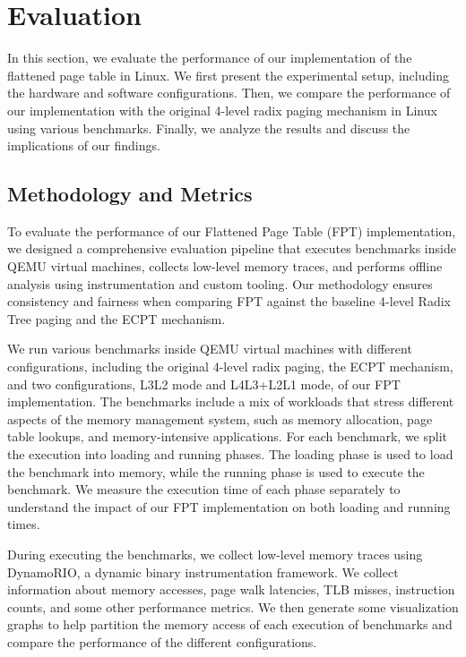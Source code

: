 \section{Evaluation}

In this section, we evaluate the performance of our implementation of the flattened page table in Linux. We first present the experimental setup, including the hardware and software configurations. Then, we compare the performance of our implementation with the original 4-level radix paging mechanism in Linux using various benchmarks. Finally, we analyze the results and discuss the implications of our findings.

\subsection{Methodology and Metrics}

To evaluate the performance of our Flattened Page Table (FPT) implementation, we designed a comprehensive evaluation pipeline that executes benchmarks inside QEMU virtual machines, collects low-level memory traces, and performs offline analysis using instrumentation and custom tooling. Our methodology ensures consistency and fairness when comparing FPT against the baseline 4-level Radix Tree paging and the ECPT mechanism.

We run various benchmarks inside QEMU virtual machines with different configurations, including the original 4-level radix paging, the ECPT mechanism, and two configurations, L3L2 mode and L4L3+L2L1 mode, of our FPT implementation. The benchmarks include a mix of workloads that stress different aspects of the memory management system, such as memory allocation, page table lookups, and memory-intensive applications. For each benchmark, we split the execution into loading and running phases. The loading phase is used to load the benchmark into memory, while the running phase is used to execute the benchmark. We measure the execution time of each phase separately to understand the impact of our FPT implementation on both loading and running times.

During executing the benchmarks, we collect low-level memory traces using DynamoRIO, a dynamic binary instrumentation framework. We collect information about memory accesses, page walk latencies, TLB misses, instruction counts, and some other performance metrics. We then generate some visualization graphs to help partition the memory access of each execution of benchmarks and compare the performance of the different configurations.

